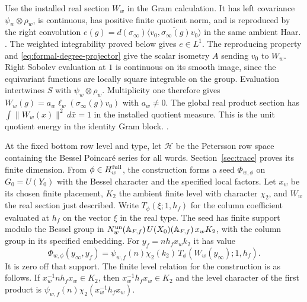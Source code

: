 Use the installed real section \(W_w\) in the Gram calculation. It has
left covariance \(\psi_w\otimes\rho_w\), is continuous, has positive
finite quotient norm, and is reproduced by the right convolution
\(e(g)=d(\sigma_\infty)\overline{\langle v_0,\sigma_\infty(g)v_0\rangle}\)
in the same ambient Haar.
.
The weighted integrability proved below gives \(e\in L^1\).
The reproducing property and \eqref{eq:formal-degree-projector}
give the scalar isometry \(A\) sending \(v_0\) to \(W_w\).
Right Sobolev
evaluation at \(1\) is continuous on its smooth image, since the
equivariant functions are locally square integrable on the group.
Evaluation intertwines \(S\) with \(\psi_w\otimes\rho_w\).
Multiplicity one therefore gives
\(W_w(g)=a_w\ell_w(\sigma_\infty(g)v_0)\) with \(a_w\ne0\).
The global real product section has
\(\int\|W_w(x)\|^2\,d\bar x=1\) in the installed quotient measure.
This is the unit quotient energy in the identity Gram block.
.

At the fixed bottom row level and type, let \(\mathcal H\) be the
Petersson row space containing the Bessel Poincar\'e series for all
words. Section~\ref{sec:trace} proves its finite dimension. From
\(\phi\in H_w^{\rm full}\), the construction forms a
seed \(\Phi_{w,\phi}\) on \(G_0=U(Y_0)\) with the Bessel character and the
specified local factors. Let \(x_w\) be its chosen finite placement,
\(K_2\) the ambient finite level with character \(\chi_2\),
and \(W_w\) the real section just described. Write
\(T_\phi(\xi;1,h_f)\) for the column coefficient evaluated at \(h_f\)
on the vector \(\xi\) in the real type. The seed has finite support
modulo the Bessel group in \(N_w^{\rm un}(\mathbb A_{F,f})\,
U(X_0)(\mathbb A_{F,f})\,x_wK_2\), with the column group in its
specified embedding. For \(y_f=n h_f x_w k_2\) it has value
\[
 \Phi_{w,\phi}(y_\infty,y_f)=
   \psi_{w,f}(n)\chi_2(k_2)\,
   T_\phi(W_w(y_\infty);1,h_f).
\]
It is zero off that support. The finite level relation for the
construction is as follows. If
\(x_w^{-1}n h_f x_w\in K_2\), then
\(x_w^{-1}h_f x_w\in K_2\) and the level character of the
first product is \(\psi_{w,f}(n)\chi_2(x_w^{-1}h_f x_w)\).


